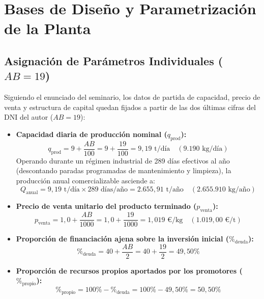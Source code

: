 \documentclass[a4paper,11pt]{report}
\providecommand{\euro}{€}
\begin{document}
\chapter{Bases de Diseño y Parametrización de la Planta}

\section{Asignación de Parámetros Individuales (\texorpdfstring{$AB = 19$}{AB = 19})}
Siguiendo el enunciado del seminario, los datos de partida de capacidad, precio de venta y estructura de capital quedan fijados a partir de las dos últimas cifras del DNI del autor ($AB = 19$):
\begin{itemize}
    \item \textbf{Capacidad diaria de producción nominal ($q_{\text{prod}}$):}
    \begin{equation}
        q_{\text{prod}} = 9 + \frac{AB}{100} = 9 + \frac{19}{100} = 9,19\text{ t/día} \quad (9.190\text{ kg/día})
    \end{equation}
    Operando durante un régimen industrial de 289 días efectivos al año (descontando paradas programadas de mantenimiento y limpieza), la producción anual comercializable asciende a:
    \begin{equation}
        Q_{\text{anual}} = 9,19\text{ t/día} \times 289\text{ días/año} = 2.655,91\text{ t/año} \quad (2.655.910\text{ kg/año})
    \end{equation}
    \item \textbf{Precio de venta unitario del producto terminado ($p_{\text{venta}}$):}
    \begin{equation}
        p_{\text{venta}} = 1,0 + \frac{AB}{1000} = 1,0 + \frac{19}{1000} = 1,019\text{ \euro/kg} \quad (1.019,00\text{ \euro/t})
    \end{equation}
    \item \textbf{Proporción de financiación ajena sobre la inversión inicial ($\%_{\text{deuda}}$):}
    \begin{equation}
        \%_{\text{deuda}} = 40 + \frac{AB}{2} = 40 + \frac{19}{2} = 49,50\%
    \end{equation}
    \item \textbf{Proporción de recursos propios aportados por los promotores ($\%_{\text{propio}}$):}
    \begin{equation}
        \%_{\text{propio}} = 100\% - \%_{\text{deuda}} = 100\% - 49,50\% = 50,50\%
    \end{equation}
\end{itemize}
\end{document}
